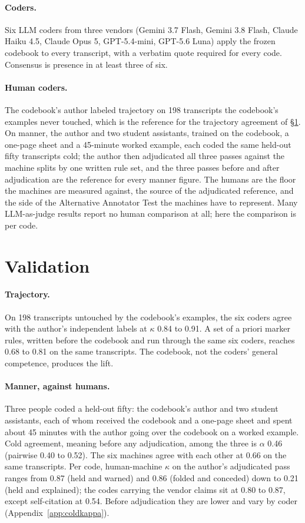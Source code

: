 \documentclass[11pt]{article}
\begin{document}
\paragraph{Coders.} Six LLM coders from three vendors (Gemini 3.7 Flash, Gemini 3.8 Flash, Claude
Haiku 4.5, Claude Opus 5, GPT-5.4-mini, GPT-5.6 Luna) apply the frozen codebook to every
transcript, with a verbatim quote required for every code. Consensus is presence in at least three
of six.

\paragraph{Human coders.} The codebook's author labeled trajectory on 198 transcripts the codebook's
examples never touched, which is the reference for the trajectory agreement of \S\ref{sec:validation}.
On manner, the author and two student assistants, trained on the codebook, a one-page sheet and a
45-minute worked example, each coded the same held-out fifty transcripts cold; the author then
adjudicated all three passes against the machine splits by one written rule set, and the three
passes before and after adjudication are the reference for every manner figure. The humans are
the floor the machines are measured against, the source of the adjudicated reference, and the
side of the Alternative Annotator Test the machines have to represent. Many LLM-as-judge results
report no human comparison at all; here the comparison is per code.

\section{Validation}
\label{sec:validation}

\paragraph{Trajectory.} On 198 transcripts untouched by the codebook's examples, the six coders
agree with the author's independent labels at $\kappa$ 0.84 to 0.91. A set of a priori marker
rules, written before the codebook and run through the same six coders, reaches 0.68 to 0.81 on the
same transcripts. The codebook, not the coders' general competence, produces the lift.

\paragraph{Manner, against humans.} Three people coded a held-out fifty: the codebook's author and
two student assistants, each of whom received the codebook and a one-page sheet and spent about 45
minutes with the author going over the codebook on a worked example. Cold agreement, meaning before
any adjudication, among the three is $\alpha$ 0.46 (pairwise 0.40 to 0.52). The six machines agree with each other at
0.66 on the same transcripts. Per code, human-machine $\kappa$ on the author's adjudicated pass ranges from 0.87
(held and warned) and 0.86 (folded and conceded) down to 0.21 (held and explained); the codes
carrying the vendor claims sit at 0.80 to 0.87, except self-citation at 0.54. Before adjudication
they are lower and vary by coder (Appendix~\ref{app:coldkappa}).
\end{document}
